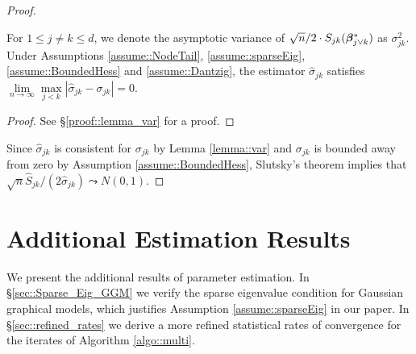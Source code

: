 \documentclass[twoside,11pt]{article}
\newcommand*{\bbetas}{\bbeta^*}
\newcommand*{\limn}{\lim \limits_{n\rightarrow \infty} }
\begin{document}
\begin{proof}
 \begin{lemma}\label{lemma::var} For $1\leq j\neq k\leq d$, we denote the asymptotic variance of $\sqrt{n}/2 \cdot S_{jk}(\bbetas_{j\vee k})$ as $\sigma_{jk}^2$. Under  Assumptions \ref{assume::NodeTail}, \ref{assume::sparseEig}, \ref{assume::BoundedHess} and \ref{assume::Dantzig},  the estimator $\hat\sigma_{jk}$  satisfies $\limn \max\limits_{j<k} | \hat\sigma _{jk} - \sigma_{jk} | = 0.$
 \end{lemma}
 \begin{proof} 
 See \S\ref{proof::lemma_var} for a proof.
 \end{proof}
 Since $\hat\sigma_{jk}$ is consistent for $\sigma_{jk}$ by Lemma \ref{lemma::var}  and $\sigma_{jk}$ is bounded away from zero by Assumption \ref{assume::BoundedHess}, Slutsky's theorem implies that $\sqrt{n} \hat{S}_{jk}/(2\hat\sigma_{jk}) \leadsto N(0,1)$.
\end{proof}

\section{Additional Estimation Results}

We present the additional results of parameter estimation. In \S \ref{sec::Sparse_Eig_GGM} we verify the sparse eigenvalue condition for Gaussian graphical models, which justifies Assumption \ref{assume::sparseEig} in our paper. In \S \ref{sec::refined_rates} we derive a more refined statistical rates of convergence for the iterates of Algorithm \ref{algo::multi}.
\end{document}
